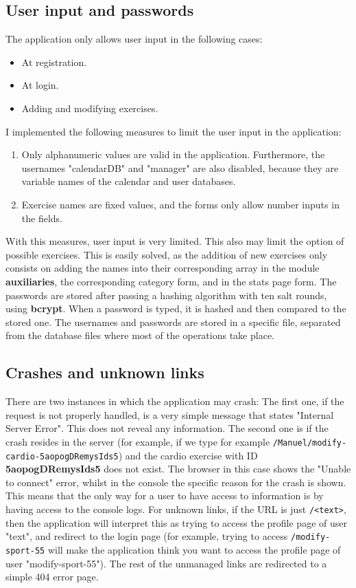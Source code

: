 \documentclass[12pt,twoside,titlepage,a4paper]{article}
\theoremstyle{definicion}
\theoremstyle{lema}
\theoremstyle{teorema}
\theoremstyle{corolario}
\theoremstyle{ejemplo}
\theoremstyle{nota}
\begin{document}
\subsection{User input and passwords}
The application only allows user input in the following cases:
\begin{itemize}[noitemsep]
	\item At registration.
	\item At login.
	\item Adding and modifying exercises.
\end{itemize}
I implemented the following measures to limit the user input in the application:
\begin{enumerate}
	\item Only alphanumeric values are valid in the application. Furthermore, the usernames "calendarDB" and "manager" are also
	disabled, because they are variable names of the calendar and user databases.
	\item Exercise names are fixed values, and the forms only allow number inputs in the fields.
\end{enumerate}
With this measures, user input is very limited. This also may limit the option of possible exercises. This is easily solved, as
the addition of new exercises only consists on adding the names into their corresponding array in the module \textbf{auxiliaries},
the corresponding category form, and in the stats page form.
\newline\newline
The passwords are stored after passing a hashing algorithm with ten salt rounds, using \textbf{bcrypt}. When a password is typed,
it is hashed and then compared to the stored one. The usernames and passwords are stored in a specific file, separated from the
database files where most of the operations take place.

\subsection{Crashes and unknown links}

There are two instances in which the application may crash: The first one, if the request is not properly handled, is a very simple
message that states "Internal Server Error". This does not reveal any information. The second one is if the crash resides in the
server (for example, if we type for example \texttt{/Manuel/modify-cardio-5aopogDRemysIds5}) and the cardio exercise with ID
\textbf{5aopogDRemysIds5} does not exist. The browser in this case shows the "Unable to connect" error, whilst in the console the
specific reason for the crash is shown. This means that the only way for a user to have access to information is by having access
to the console logs.
\newline\newline
For unknown links, if the URL is just \texttt{/<text>}, then the application will interpret this as trying to access the profile
page of user "text", and redirect to the login page (for example, trying to access \texttt{/modify-sport-55} will make the
application think you want to access the profile page of user "modify-sport-55"). The rest of the unmanaged links are redirected
to a simple 404 error page.
\end{document}
